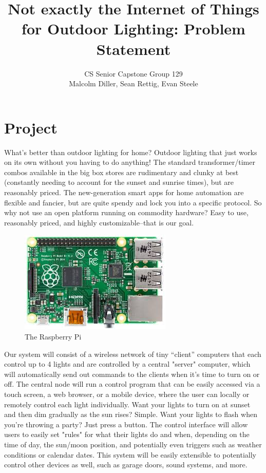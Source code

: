 \documentclass{article}
\title{Not exactly the Internet of Things for Outdoor Lighting: Problem Statement}
\author{CS Senior Capstone Group 129\\Malcolm Diller, Sean Rettig, Evan Steele}
\date{}
\begin{document}
\maketitle

\section{Project} What's better than outdoor lighting for home?  Outdoor
lighting that just works on its own without you having to do anything!  The
standard transformer/timer combos available in the big box stores are
rudimentary and clunky at best (constantly needing to account for the sunset
and sunrise times), but are reasonably priced. The new-generation smart apps
for home automation are flexible and fancier, but are quite spendy and lock you
into a specific protocol.  So why not use an open platform running on commodity
hardware?  Easy to use, reasonably priced, and highly customizable--that is our
goal.

\begin{figure}[h!]
\centering
\includegraphics[scale=0.5]{raspi.jpg}
\caption{The Raspberry Pi}
\label{fig:raspberry pi}
\end{figure}

Our system will consist of a wireless network of tiny “client” computers that
each control up to 4 lights and are controlled by a central "server" computer,
which will automatically send out commands to the clients when it's time to
turn on or off.  The central node will run a control program that can be easily
accessed via a touch screen, a web browser, or a mobile device, where the user
can locally or remotely control each light individually.  Want your lights to
turn on at sunset and then dim gradually as the sun rises?  Simple.  Want your
lights to flash when you're throwing a party?  Just press a button.  The
control interface will allow users to easily set "rules" for what their lights
do and when, depending on the time of day, the sun/moon position, and
potentially even triggers such as weather conditions or calendar dates.  This
system will be easily extensible to potentially control other devices as well,
such as garage doors, sound systems, and more.
\end{document}
